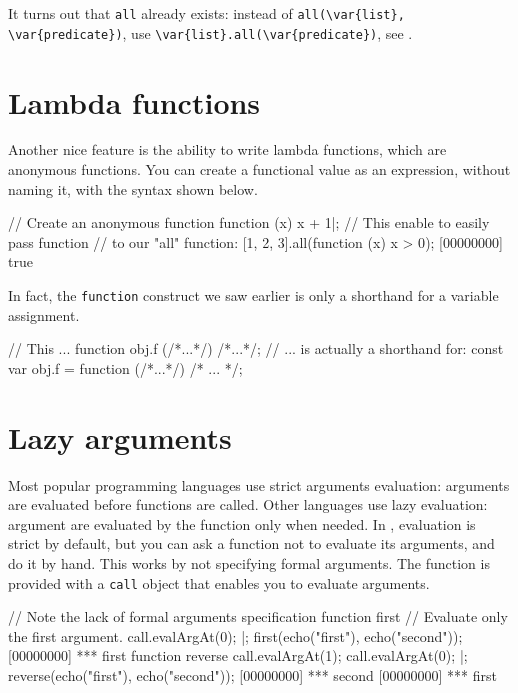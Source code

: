 It turns out that \lstinline|all| already exists: instead of
\lstinline|all(\var{list}, \var{predicate})|, use
\lstinline|\var{list}.all(\var{predicate})|, see
.

\section{Lambda functions}

Another nice feature is the ability to write lambda functions, which
are anonymous functions. You can create a functional value as an
expression, without naming it, with the syntax shown below.

\begin{urbiscript}
// Create an anonymous function
function (x) {x + 1}|;
// This enable to easily pass function
// to our "all" function:
[1, 2, 3].all(function (x) { x > 0});
[00000000] true
\end{urbiscript}

In fact, the \lstinline{function} construct we saw earlier is only a
shorthand for a variable assignment.

\begin{urbiunchecked}
// This ...
function obj.f (/*...*/) {/*...*/};
// ... is actually a shorthand for:
const var obj.f = function (/*...*/) {/* ... */};
\end{urbiunchecked}

\section{Lazy arguments}

Most popular programming languages use strict arguments evaluation:
arguments are evaluated before functions are called. Other languages use
lazy evaluation: argument are evaluated by the function only when needed. In
\us, evaluation is strict by default, but you can ask a function not to
evaluate its arguments, and do it by hand. This works by not specifying
formal arguments. The function is provided with a \lstinline{call} object
that enables you to evaluate arguments.

\begin{urbiscript}
// Note the lack of formal arguments specification
function first
{
  // Evaluate only the first argument.
  call.evalArgAt(0);
}|;
first(echo("first"), echo("second"));
[00000000] *** first
function reverse
{
  call.evalArgAt(1);
  call.evalArgAt(0);
}|;
reverse(echo("first"), echo("second"));
[00000000] *** second
[00000000] *** first
\end{urbiscript}

